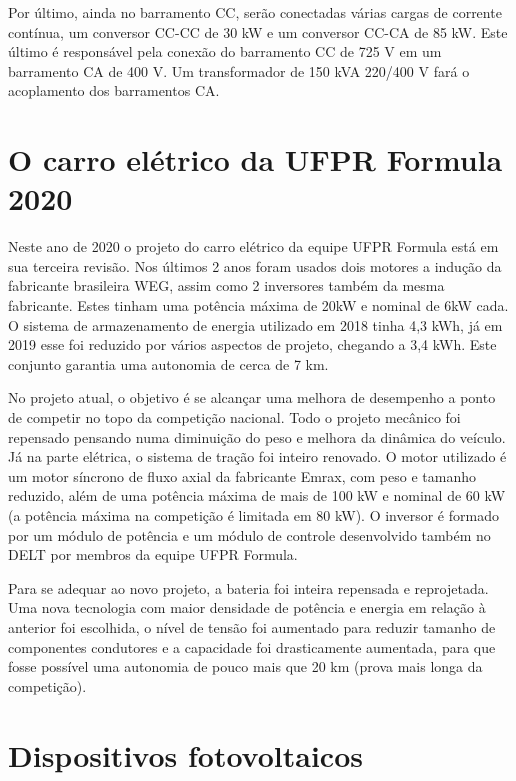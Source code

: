    Por último, ainda no barramento CC, serão conectadas várias cargas de corrente contínua, um conversor CC-CC de 30 kW e um conversor CC-CA de 85 kW. Este último é responsável pela conexão do barramento CC de 725 V em um barramento CA de 400 V. Um transformador de 150 kVA 220/400 V fará o acoplamento dos barramentos CA.


\section{O carro elétrico da UFPR Formula 2020}

   Neste ano de 2020 o projeto do carro elétrico da equipe UFPR Formula está em sua terceira revisão. Nos últimos 2 anos foram usados dois motores a indução da fabricante brasileira WEG, assim como 2 inversores também da mesma fabricante. Estes tinham uma potência máxima de 20kW e nominal de 6kW cada. O sistema de armazenamento de energia utilizado em 2018 tinha 4,3 kWh, já em 2019 esse foi reduzido por vários aspectos de projeto, chegando a 3,4 kWh. Este conjunto garantia uma autonomia de cerca de 7 km.

   No projeto atual, o objetivo é se alcançar uma melhora de desempenho a ponto de competir no topo da competição nacional. Todo o projeto mecânico foi repensado pensando numa diminuição do peso e melhora da dinâmica do veículo. Já na parte elétrica, o sistema de tração foi inteiro renovado. O motor utilizado é um motor síncrono de fluxo axial da fabricante Emrax, com peso e tamanho reduzido, além de uma potência máxima de mais de 100 kW e nominal de 60 kW (a potência máxima na competição é limitada em 80 kW). O inversor é formado por um módulo de potência e um módulo de controle desenvolvido também no DELT por membros da equipe UFPR Formula. 

   Para se adequar ao novo projeto, a bateria foi inteira repensada e reprojetada. Uma nova tecnologia com maior densidade de potência e energia em relação à anterior foi escolhida, o nível de tensão foi aumentado para reduzir tamanho de componentes condutores e a capacidade foi drasticamente aumentada, para que fosse possível uma autonomia de pouco mais que 20 km (prova mais longa da competição).


\section{Dispositivos fotovoltaicos}

